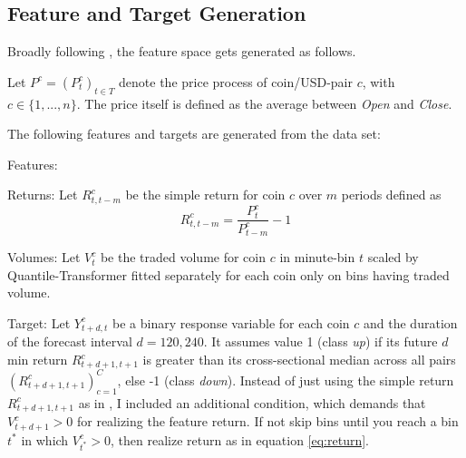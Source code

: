 \subsection{Feature and Target Generation} \label{ch:feature_and_target}
Broadly following \cite{takeuchi2013momentumTrading},
the feature space gets generated as follows.

Let $ P^{c} = ( P^{c}_{t} )_{t \in T} $ denote the price process of coin/USD-pair $ c $, with $ c \in \{1, ... , n\} $. 
The price itself is defined as the average between \textit{Open} and \textit{Close}.

The following features and targets are generated from the data set:

\begin{basedescript}{%
    \desclabelstyle{\multilinelabel}
    \desclabelwidth{3cm}}    
    \item[Features:] 
    \begin{basedescript}{%
        \desclabelstyle{\multilinelabel}
        \desclabelwidth{2cm}}  
        \item[Returns:] Let $ R^{c}_{t, t - m} $ be the simple return for coin $ c $ over $ m $ periods defined as
        \begin{equation}
            \label{eq:return}
            R^{c}_{t, t - m} = \frac{ P^{c}_{t} }{ P^{c}_{t - m} } - 1 
        \end{equation} 
        \item[Volumes:] {
            Let $ V^{c}_{t} $ be the traded volume for coin $ c $ in minute-bin $ t $ scaled by Quantile-Transformer 
            fitted separately for each coin only on bins having traded volume. 
        }
    \end{basedescript}
    \item[Target:] {
        Let $ Y^{c}_{t + d, t} $ be a binary response variable for each coin $c$ 
        and the duration of the forecast interval $ d = 120, 240 $. 
        It assumes value 1 (class \textit{up}) if its future $d$ min return $ R^{c}_{t + d + 1, t + 1} $ is greater 
        than its cross-sectional median across all pairs $ ( R^{c}_{t + d + 1, t + 1} )^{C}_{c=1} $, 
        else -1 (class \textit{down}). 
        Instead of just using the simple return $ R^{c}_{t + d + 1, t + 1} $ as in \cite{krauss2019statisticalArbitrage},
        I included an additional condition, which demands that $  V^{c}_{t + d + 1} > 0 $ for realizing the feature return.
        If not skip bins until you reach a bin $ t^{*} $  in which $  V^{c}_{ t^{*} } > 0 $, 
        then realize return as in equation \ref{eq:return}.
    }
\end{basedescript}    


